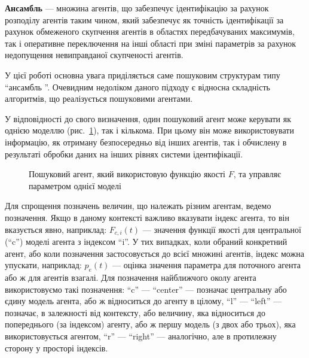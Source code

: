 \documentclass[a4paper,13pt]{atuaref}
\begin{document}
\textbf {Ансамбль} ---
множина агентів, що забезпечує ідентифікацію за рахунок розподілу агентів таким
чином, який забезпечує як точність ідентифікації за рахунок обмеженого
скупчення агентів в областях передбачуваних максимумів, так і оперативне
переключення на інші області при зміні параметрів за рахунок недопущення
невиправданої скупченості агентів.

У цієї роботі основна увага приділяється саме пошуковим структурам типу
``ансамбль ''. Очевидним недоліком даного підходу є відносна складність
алгоритмів, що реалізується пошуковими агентами.

У відповідності до свого визначення, один пошуковий агент може керувати як
однією моделлю (рис.~\ref{atu:f:agent1}), так і кількома. При цьому він
може використовувати інформацію, як отриману безпосередньо від інших агентів,
так і обчислену в результаті обробки даних на інших рівнях системи
ідентифікації.

\begin{figure}[htb!]
\begin{center}

\end{center}
\caption{Пошуковий агент, який використовую функцію якості $F$, та управляє параметром однієї моделі}
\label{atu:f:agent1}
\end{figure}

Для спрощення позначень величин, що належать різним агентам, ведемо
позначення. Якщо в даному контексті важливо вказувати індекс агента, то він
вказується явно, наприклад: $F_{c, i} (t)$ --- значення функції якості для
центральної (``c'') моделі агента з індексом ``i''. У тих випадках, коли
обраний конкретний агент, або коли позначення застосовується до всієї множині
агентів, індекс можна упускати, наприклад: $p_e (t)$
--- оцінка значення параметра для поточного агента або ж для агентів взагалі.
Для позначення найближчого околу агента використовуємо такі позначення:
``c'' --- ``center'' --- позначає центральну або єдину модель агента, або ж
відноситься до агенту в цілому, ``l'' --- ``left'' --- позначає, в
залежності від контексту, або величину, яка відноситься до попереднього (за
індексом) агенту, або ж першу модель (з двох або трьох), яка використовується
агентом, ``r'' --- ``right'' --- аналогічно, але в протилежну сторону у
просторі індексів.
\end{document}
